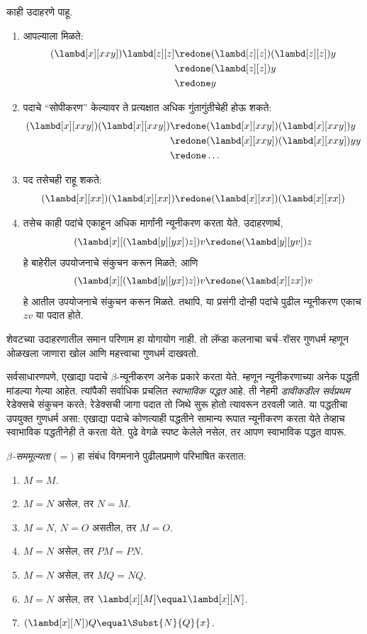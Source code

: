 काही उदाहरणे पाहू.
\begin{enumerate}
\item आपल्याला मिळते:
\begin{align*}
(\lambd[x][xxy]) \lambd[z][z] & \redone (\lambd[z][z])(\lambd[z][z]) y \\
& \redone (\lambd[z][z]) y \\
& \redone y
\end{align*}
\item पदाचे ``सोपीकरण'' केल्यावर ते प्रत्यक्षात अधिक गुंतागुंतीचेही होऊ शकते:
\begin{align*}
(\lambd[x][xxy])(\lambd[x][xxy]) & \redone (\lambd[x][xxy])(\lambd[x][xxy])y \\
& \redone (\lambd[x][xxy])(\lambd[x][xxy])yy \\
& \redone \dots
\end{align*}
\item पद तसेचही राहू शकते:
\[(\lambd[x][xx])(\lambd[x][xx]) \redone (\lambd[x][xx])(\lambd[x][xx])
\]
\item तसेच काही पदांचे एकाहून अधिक मार्गांनी न्यूनीकरण
  करता येते. उदाहरणार्थ,
\[(\lambd[x][(\lambd[y][yx]) z]) v \redone (\lambd[y][yv]) z
\]
हे बाहेरील उपयोजनाचे संकुचन करून मिळते; आणि
\[(\lambd[x][(\lambd[y][yx]) z]) v \redone (\lambd[x][zx]) v
\]
हे आतील उपयोजनाचे संकुचन करून मिळते. तथापि,
या प्रसंगी दोन्ही पदांचे पुढील न्यूनीकरण एकाच
$zv$ या पदात होते.
\end{enumerate}

शेवटच्या उदाहरणातील समान परिणाम हा योगायोग नाही.
तो लॅम्डा कलनाचा चर्च–रॉसर गुणधर्म म्हणून ओळखला
जाणारा खोल आणि महत्त्वाचा गुणधर्म दाखवतो.

\begin{digress}
  सर्वसाधारणपणे, एखाद्या पदाचे $\beta$-न्यूनीकरण
  अनेक प्रकारे करता येते. म्हणून न्यूनीकरणाच्या अनेक
  पद्धती मांडल्या गेल्या आहेत. त्यांपैकी सर्वाधिक प्रचलित
  \emph{स्वाभाविक पद्धत} आहे. ती नेहमी \emph{डावीकडील
  सर्वप्रथम} रेडेक्सचे संकुचन करते; रेडेक्सची जागा
  पदात तो जिथे सुरू होतो त्यावरून ठरवली जाते.
  या पद्धतीचा उपयुक्त गुणधर्म असा: एखाद्या पदाचे
  कोणत्याही पद्धतीने सामान्य रूपात न्यूनीकरण करता येते
  तेव्हाच स्वाभाविक पद्धतीनेही ते करता येते. पुढे
  वेगळे स्पष्ट केलेले नसेल, तर आपण स्वाभाविक पद्धत वापरू.
\end{digress}

\begin{defn}
  \emph{$\beta$-सममूल्यता} ($\equal$) हा संबंध विगमनाने
  पुढीलप्रमाणे परिभाषित करतात:
  \begin{enumerate}
  \item $M \equal M$.
  \item $M \equal N$ असेल, तर $N \equal M$.
  \item $M \equal N$, $N \equal O$ असतील, तर $M \equal O$.
  \item $M \equal N$ असेल, तर $PM \equal PN$.
  \item $M \equal N$ असेल, तर $MQ \equal NQ$.
  \item $M \equal N$ असेल, तर $\lambd[x][M] \equal \lambd[x][N]$.
  \item $(\lambd[x][N])Q \equal \Subst{N}{Q}{x}$.
  \end{enumerate}
\end{defn}

